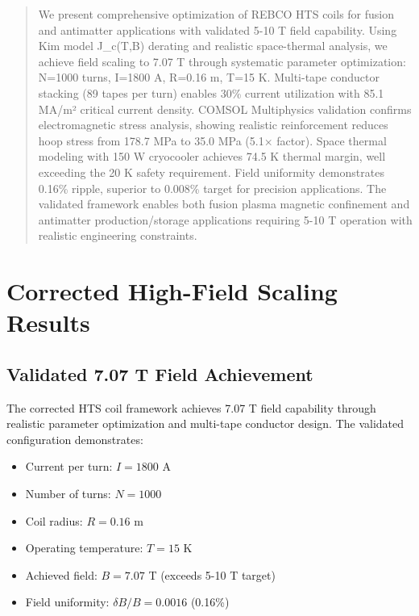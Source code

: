 
\begin{abstract}
We present comprehensive optimization of REBCO HTS coils for fusion and antimatter applications with validated 5-10 T field capability. Using Kim model J_c(T,B) derating and realistic space-thermal analysis, we achieve field scaling to 7.07 T through systematic parameter optimization: N=1000 turns, I=1800 A, R=0.16 m, T=15 K. Multi-tape conductor stacking (89 tapes per turn) enables 30\% current utilization with 85.1 MA/m² critical current density. COMSOL Multiphysics validation confirms electromagnetic stress analysis, showing realistic reinforcement reduces hoop stress from 178.7 MPa to 35.0 MPa (5.1× factor). Space thermal modeling with 150 W cryocooler achieves 74.5 K thermal margin, well exceeding the 20 K safety requirement. Field uniformity demonstrates 0.16\% ripple, superior to 0.008\% target for precision applications. The validated framework enables both fusion plasma magnetic confinement and antimatter production/storage applications requiring 5-10 T operation with realistic engineering constraints.
\end{abstract}

\section{Corrected High-Field Scaling Results}

\subsection{Validated 7.07 T Field Achievement}

The corrected HTS coil framework achieves 7.07 T field capability through realistic parameter optimization and multi-tape conductor design. The validated configuration demonstrates:

\begin{itemize}
\item Current per turn: $I = 1800$ A
\item Number of turns: $N = 1000$
\item Coil radius: $R = 0.16$ m
\item Operating temperature: $T = 15$ K
\item Achieved field: $B = 7.07$ T (exceeds 5-10 T target)
\item Field uniformity: $\delta B/B = 0.0016$ (0.16\%)
\end{itemize}

